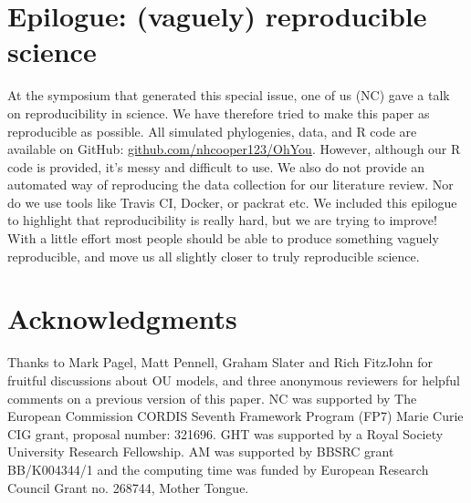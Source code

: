 \documentclass[a4paper,12pt]{article}
\begin{document}

\section{Epilogue: (vaguely) reproducible science}
  At the symposium that generated this special issue, one of us (NC) gave a talk on reproducibility in science. 
  We have therefore tried to make this paper as reproducible as possible. 
  All simulated phylogenies, data, and R code are available on GitHub: \href{https://github.com/nhcooper123/OhYou}{github.com/nhcooper123/OhYou}.
  However, although our R code is provided, it's messy and difficult to use. 
  We also do not provide an automated way of reproducing the data collection for our literature review.
  Nor do we use tools like Travis CI, Docker, or packrat etc.
  We included this epilogue to highlight that reproducibility is really hard, but we are trying to improve! 
  With a little effort most people should be able to produce something vaguely reproducible, and move us all slightly closer to truly reproducible science. 

\section{Acknowledgments}
  Thanks to Mark Pagel, Matt Pennell, Graham Slater and Rich FitzJohn for fruitful discussions about OU models, and three anonymous reviewers for helpful comments on a previous version of this paper. NC was supported by The European Commission CORDIS Seventh Framework Program (FP7) Marie Curie CIG grant, proposal number: 321696. GHT was supported by a Royal Society University Research Fellowship. AM was supported by BBSRC grant BB/K004344/1 and the computing time was funded by European Research Council Grant no. 268744, Mother Tongue.
\end{document}
